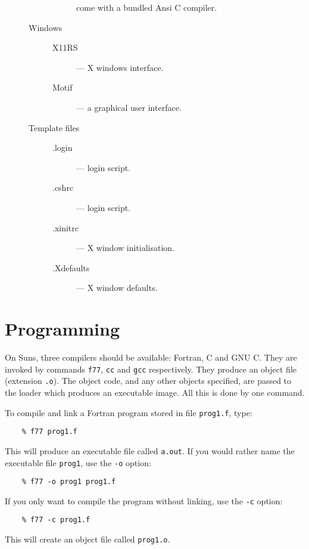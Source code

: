 \begin{description}
\begin{description}
\begin{description}
 come with a bundled Ansi C compiler.
\end{description}
\item [Windows] \hspace*{\fill}
\begin{description}
\item [X11RS] --- X windows interface.
\item [Motif] --- a graphical user interface.
\end{description}
\item [Template files] \hspace*{\fill}
\begin{description}
\item [.login] --- login script.
\item [.cshrc] --- login script.
\item [.xinitrc] --- X window initialisation.
\item [.Xdefaults] --- X window defaults.
\end{description}
\end{description}
\end{description}

\section{Programming}

On Suns, three compilers should be available: Fortran, C and GNU C.
They are invoked by commands {\tt f77}, {\tt cc} and {\tt gcc} respectively.
They produce an object file (extension {\tt .o}).
The object code, and any other objects specified, are passed to the loader
which produces an executable image.
All this is done by one command.

To compile and link a Fortran program stored in file {\tt prog1.f}, type:
\begin{verbatim}
    % f77 prog1.f
\end{verbatim}
This will produce an executable file called {\tt a.out}.
If you would rather name the executable file {\tt prog1}, use the {\tt -o}
option:
\begin{verbatim}
    % f77 -o prog1 prog1.f
\end{verbatim}
If you only want to compile the program without linking, use the {\tt -c}
option:
\begin{verbatim}
    % f77 -c prog1.f
\end{verbatim}
This will create an object file called {\tt prog1.o}.

